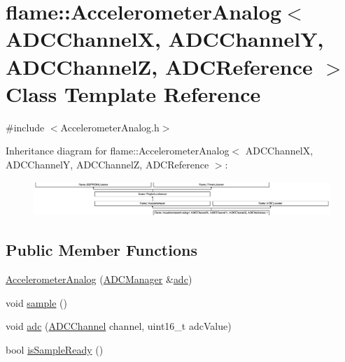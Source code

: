 \hypertarget{classflame_1_1_accelerometer_analog}{\section{flame\-:\-:Accelerometer\-Analog$<$ A\-D\-C\-Channel\-X, A\-D\-C\-Channel\-Y, A\-D\-C\-Channel\-Z, A\-D\-C\-Reference $>$ Class Template Reference}
\label{classflame_1_1_accelerometer_analog}
}


{\ttfamily \#include $<$Accelerometer\-Analog.\-h$>$}

Inheritance diagram for flame\-:\-:Accelerometer\-Analog$<$ A\-D\-C\-Channel\-X, A\-D\-C\-Channel\-Y, A\-D\-C\-Channel\-Z, A\-D\-C\-Reference $>$\-:\begin{figure}[H]
\begin{center}
\leavevmode
\includegraphics[height=1.321534cm]{classflame_1_1_accelerometer_analog}
\end{center}
\end{figure}
\subsection*{Public Member Functions}
\begin{DoxyCompactItemize}
\item 
\hyperlink{classflame_1_1_accelerometer_analog_a1beaaa7e83da69d8c92ae08698eaa112}{Accelerometer\-Analog} (\hyperlink{classflame_1_1_a_d_c_manager}{A\-D\-C\-Manager} \&\hyperlink{classflame_1_1_accelerometer_analog_a430e1a8a3b101bfe9d3b988efa1e75f9}{adc})
\item 
void \hyperlink{classflame_1_1_accelerometer_analog_a78759b15cda131a4af795f5f1c598076}{sample} ()
\item 
void \hyperlink{classflame_1_1_accelerometer_analog_a430e1a8a3b101bfe9d3b988efa1e75f9}{adc} (\hyperlink{atmega1280_8h_ab5a361d214bf33f4d9d443d9db44043d}{A\-D\-C\-Channel} channel, uint16\-\_\-t adc\-Value)
\item 
bool \hyperlink{classflame_1_1_accelerometer_analog_aa638bdb59ae5392bc61c66329538f89d}{is\-Sample\-Ready} ()
\end{DoxyCompactItemize}
